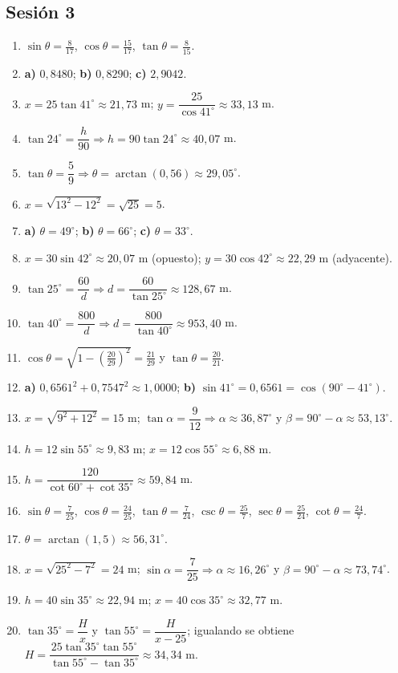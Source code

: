 \documentclass[12pt, letterpaper]{article}
\providecommand{\sen}{\sin}
\begin{document}
\subsection*{Sesión 3}
\begin{enumerate}[leftmargin=*, label=\textbf{\arabic*.}]
  \item $\sen\theta=\frac{8}{17}$, $\cos\theta=\frac{15}{17}$, $\tan\theta=\frac{8}{15}$.
  \item \textbf{a)} $0{,}8480$; \quad \textbf{b)} $0{,}8290$; \quad \textbf{c)} $2{,}9042$.
  \item $x=25\tan 41^{\circ}\approx 21{,}73$ m; $y=\dfrac{25}{\cos 41^{\circ}}\approx 33{,}13$ m.
  \item $\tan 24^{\circ}=\dfrac{h}{90}\Rightarrow h=90\tan 24^{\circ}\approx 40{,}07$ m.
  \item $\tan\theta=\dfrac{5}{9}\Rightarrow\theta=\arctan\left(0{,}56\right)\approx 29{,}05^{\circ}$.
  \item $x=\sqrt{13^2-12^2}=\sqrt{25}=5$.
  \item \textbf{a)} $\theta=49^{\circ}$; \quad \textbf{b)} $\theta=66^{\circ}$; \quad \textbf{c)} $\theta=33^{\circ}$.
  \item $x=30\sen 42^{\circ}\approx 20{,}07$ m (opuesto); $y=30\cos 42^{\circ}\approx 22{,}29$ m (adyacente).
  \item $\tan 25^{\circ}=\dfrac{60}{d}\Rightarrow d=\dfrac{60}{\tan 25^{\circ}}\approx 128{,}67$ m.
  \item $\tan 40^{\circ}=\dfrac{800}{d}\Rightarrow d=\dfrac{800}{\tan 40^{\circ}}\approx 953{,}40$ m.
  \item $\cos\theta=\sqrt{1-\left(\frac{20}{29}\right)^2}=\frac{21}{29}$ y $\tan\theta=\frac{20}{21}$.
  \item \textbf{a)} $0{,}6561^2+0{,}7547^2\approx 1{,}0000$; \quad \textbf{b)} $\sen 41^{\circ}=0{,}6561=\cos(90^{\circ}-41^{\circ})$. \checkmark
  \item $x=\sqrt{9^2+12^2}=15$ m; $\tan\alpha=\dfrac{9}{12}\Rightarrow\alpha\approx 36{,}87^{\circ}$ y $\beta=90^{\circ}-\alpha\approx 53{,}13^{\circ}$.
  \item $h=12\sen 55^{\circ}\approx 9{,}83$ m; $x=12\cos 55^{\circ}\approx 6{,}88$ m.
  \item $h=\dfrac{120}{\cot 60^{\circ}+\cot 35^{\circ}}\approx 59{,}84$ m.
  \item $\sen\theta=\frac{7}{25}$, $\cos\theta=\frac{24}{25}$, $\tan\theta=\frac{7}{24}$, $\csc\theta=\frac{25}{7}$, $\sec\theta=\frac{25}{24}$, $\cot\theta=\frac{24}{7}$.
  \item $\theta=\arctan\left(1{,}5\right)\approx 56{,}31^{\circ}$.
  \item $x=\sqrt{25^2-7^2}=24$ m; $\sen\alpha=\dfrac{7}{25}\Rightarrow\alpha\approx 16{,}26^{\circ}$ y $\beta=90^{\circ}-\alpha\approx 73{,}74^{\circ}$.
  \item $h=40\sen 35^{\circ}\approx 22{,}94$ m; $x=40\cos 35^{\circ}\approx 32{,}77$ m.
  \item $\tan 35^{\circ}=\dfrac{H}{x}$ y $\tan 55^{\circ}=\dfrac{H}{x-25}$; igualando se obtiene $H=\dfrac{25\tan 35^{\circ}\tan 55^{\circ}}{\tan 55^{\circ}-\tan 35^{\circ}}\approx 34{,}34$ m.
\end{enumerate}
\end{document}
